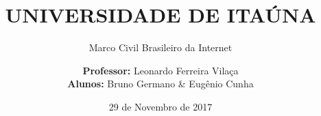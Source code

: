\title{UNIVERSIDADE DE ITAÚNA}
\subtitle{Marco Civil Brasileiro da Internet}
\date{29 de Novembro de 2017}
\author{\textbf{Professor:} Leonardo Ferreira Vilaça \\ \textbf{Alunos:} Bruno Germano \& Eugênio Cunha}
